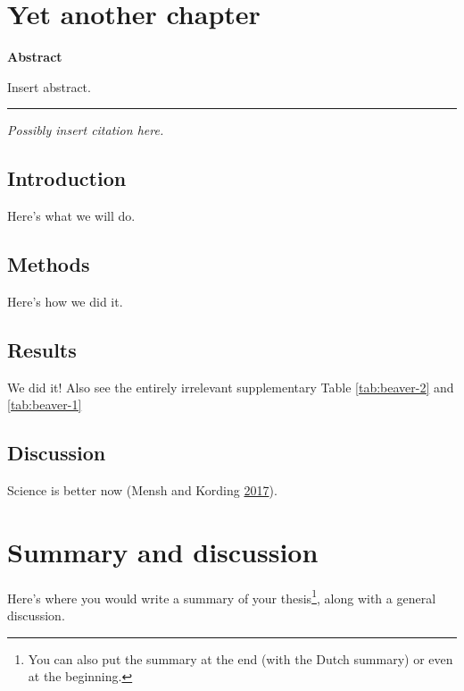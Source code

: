 \documentclass[12pt,english,a4paper,oneside,]{book} %
\let\rmarkdownfootnote\footnote%
\def\footnote{\protect\rmarkdownfootnote}
\renewcommand{\linethickness}{0.05em}
\theoremstyle{definition}
\theoremstyle{definition}
\theoremstyle{definition}
\theoremstyle{remark}
\begin{document}
\hypertarget{yet-another-chapter}{%
\chapter{Yet another chapter}\label{yet-another-chapter}}

\textbf{Abstract}

\noindent 
Insert abstract.

\begin{center}\rule{0.5\linewidth}{\linethickness}\end{center}

\vspace*{\fill}

\noindent
\emph{Possibly insert citation here.}
\newpage

\hypertarget{intro3}{%
\section{Introduction}\label{intro3}}

Here's what we will do.

\hypertarget{methods3}{%
\section{Methods}\label{methods3}}

Here's how we did it.

\hypertarget{results3}{%
\section{Results}\label{results3}}

We did it! Also see the entirely irrelevant supplementary Table \ref{tab:beaver-2} and \ref{tab:beaver-1}

\hypertarget{discussion3}{%
\section{Discussion}\label{discussion3}}

Science is better now (Mensh and Kording \protect\hyperlink{ref-Mensh2017}{2017}).

\hypertarget{summary-and-discussion}{%
\chapter{Summary and discussion}\label{summary-and-discussion}}

Here's where you would write a summary of your thesis\footnote{You can also put the summary at the end (with the Dutch summary) or even at the beginning.}, along with a general discussion.
\end{document}
